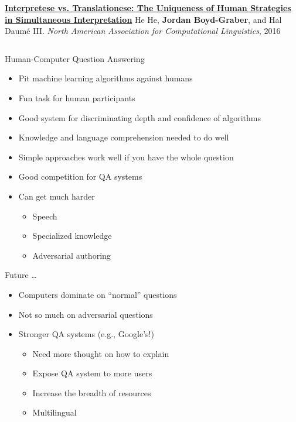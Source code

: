\documentclass[aspectratio=169,xcolor=dvipsnames]{beamer}
\begin{document}
\begin{frame}{}
\begin{columns}
        \begin{block}{ {\bf \href{http://umiacs.umd.edu/~jbg/docs/2016_naacl_interpretese.pdf}{Interpretese vs. Translationese: The Uniqueness of Human Strategies in Simultaneous Interpretation}}}
He He, {\bf Jordan Boyd-Graber}, and Hal {Daum\'{e} III}.
\emph{North American Association for Computational Linguistics}, 2016
        \end{block}

  \end{columns}


\end{frame}


\begin{frame}{Human-Computer Question Answering}

  \begin{itemize}
    \item Pit machine learning algorithms against humans
    \item Fun task for human participants
    \item Good system for discriminating depth and confidence of
      algorithms
    \item Knowledge and language comprehension needed to do well
    \item Simple approaches work well if you have the whole question
    \item Good competition for QA systems
    \item Can get much harder
      \begin{itemize}
        \item Speech
       \item Specialized knowledge
        \item Adversarial authoring
      \end{itemize}
  \end{itemize}

\end{frame}


\begin{frame}{Future \dots}

  \begin{itemize}
    \item Computers dominate on ``normal'' questions
    \item Not so much on adversarial questions
    \item Stronger QA systems (e.g., Google's!)
      \begin{itemize}
        \item Need more thought on how to explain
        \item Expose QA system to more users
        \item Increase the breadth of resources
        \item Multilingual
      \end{itemize}
  \end{itemize}

\end{frame}
\end{document}
